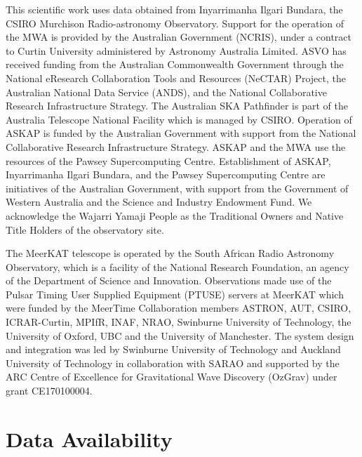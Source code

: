 \documentclass[fleqn,usenatbib]{mnras}
\begin{document}
 This scientific work uses data obtained from Inyarrimanha Ilgari Bundara, the CSIRO Murchison Radio-astronomy Observatory. Support for the operation of the MWA is provided by the Australian Government (NCRIS), under a contract to Curtin University administered by Astronomy Australia Limited. ASVO has received funding from the Australian Commonwealth Government through the National eResearch Collaboration Tools and Resources (NeCTAR) Project, the Australian National Data Service (ANDS), and the National Collaborative Research Infrastructure Strategy.
The Australian SKA Pathfinder is part of the Australia Telescope National Facility which is managed by CSIRO. Operation of ASKAP is funded by the Australian Government with support from the National Collaborative Research Infrastructure Strategy. ASKAP and the MWA use the resources of the Pawsey Supercomputing Centre. Establishment of ASKAP, Inyarrimanha Ilgari Bundara, and the Pawsey Supercomputing Centre are initiatives of the Australian Government, with support from the Government of Western Australia and the Science and Industry Endowment Fund. We acknowledge the Wajarri Yamaji People as the Traditional Owners and Native Title Holders of the observatory site.

The MeerKAT telescope is operated by the South African Radio Astronomy Observatory, which is a facility of the National Research Foundation, an agency of the Department of Science and Innovation.
  Observations made use of the Pulsar Timing User Supplied Equipment (PTUSE) servers at MeerKAT which were funded by the MeerTime Collaboration members ASTRON, AUT, CSIRO, ICRAR-Curtin, MPIfR, INAF, NRAO, Swinburne University of Technology, the University of Oxford, UBC and the University of Manchester.  The system design and integration was led by Swinburne University of Technology and Auckland University of Technology in collaboration with SARAO and supported by the ARC Centre of Excellence for Gravitational Wave Discovery (OzGrav) under grant CE170100004.

\section*{Data Availability}
\end{document}
